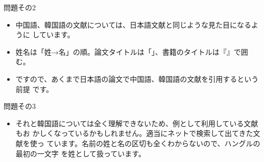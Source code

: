 \documentclass{ltjsarticle}
\begin{document}
問題その2
\begin{itemize}
 \item 中国語、韓国語の文献については、日本語文献と同じような見た目になるように
       しています。
 \item 姓名は「姓→名」の順。論文タイトルは「」、書籍のタイトルは『』で囲む。
 \item ですので、あくまで日本語の論文で中国語、韓国語の文献を引用するという前提
       です。
\end{itemize}

問題その3
\begin{itemize}
 \item それと韓国語については全く理解できないため、例として利用している文献もお
       かしくなっているかもしれません。適当にネットで検索して出てきた文献を使っ
       ています。名前の姓と名の区切も全くわからないので、ハングルの最初の一文字
       を姓として扱っています。
\end{itemize}



\vspace{1em}


% 

\nocite{*}



%
% 

\end{document}

